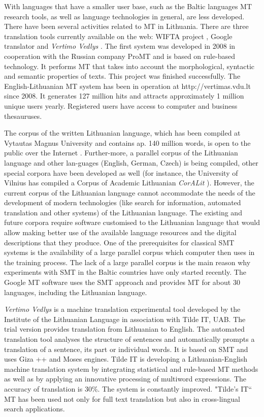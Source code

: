 \begin{multicols}{2}
    With languages that have a smaller user base, such as the Baltic languages MT research tools, as well as language technologies in general, are less developed. There have been several activities related to MT in Lithuania. There are three translation tools currently available on the web: WIFTA project \cite{vertvdu},  Google translator and \textit{Vertimo Vedlys} \cite{mvlab}.  The first system was developed in 2008 in cooperation with the Russian company ProMT and is based on rule-based technology. It performs MT that takes into account the morphological, syntactic and semantic properties of texts. This project was finished successfully. The English-Lithuanian MT system has been in operation at http://vertimas.vdu.lt since 2008. It generates 127 million hits and attracts approximately 1 million unique users yearly. Registered users have access to computer and business thesauruses.

    The corpus of the written Lithuanian language, which has been compiled at Vytautas Magnus University and contains ap. 140 million words, is open to the public over the Internet \cite{tekstynas}.  Further-more, a parallel corpus of the Lithuanian language and other lan-guages (English, German, Czech) is being compiled, other special corpora have been developed as well (for instance, the University of Vilnius has compiled a Corpus of Academic Lithuanian \textit{CorALit} \cite{coralit}). However, the current corpus of the Lithuanian language cannot accommodate the needs of the development of modern technologies (like search for information, automated translation and other systems) of the Lithuanian language. The existing and future corpora require software customised to the Lithuanian language that would allow making better use of the available language resources and the digital descriptions that they produce. One of the prerequisites for classical SMT systems is the  availability of a large parallel corpus which computer then uses in the training process. The lack of a large parallel corpus is the main reason why experiments with SMT in the Baltic countries have only started recently.  
    The Google MT software uses the SMT approach and provides MT for about 30 languages, including the Lithuanian language.

\textit{Vertimo Vedlys } is a machine translation experimental tool developed by the Institute of the Lithuanian Language in association with Tilde IT, UAB. The trial version provides translation from Lithuanian to English. The automated translation tool analyses the structure of sentences and automatically prompts a translation of a sentence, its part or individual words. It is based on SMT and uses Giza ++ and Moses engines. Tilde IT is developing a Lithuanian-English machine translation system by integrating statistical and rule-based MT methods as well as by applying an innovative processing of multiword expressions. The accuracy of translation is 30\%. The system is constantly improved. "Tilde's IT“ MT has been used not only for full text translation but also in cross-lingual search applications.


\end{multicols}
